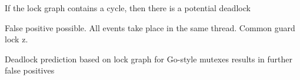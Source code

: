 \documentclass[landscape, a4paper]{article}
\begin{document}
\begin{minipage}[t]{0.19\linewidth}
\begin{betterlist}
		\item If the lock graph contains a cycle, then there is a potential deadlock
		\item {} False positive possible. All events take place in the same thread. Common guard lock z.
		\begin{betterlist}
			\item Deadlock prediction based on lock graph for Go-style mutexes results in further false positives
		\end{betterlist}
	\end{betterlist}
\end{minipage}
\end{document}
